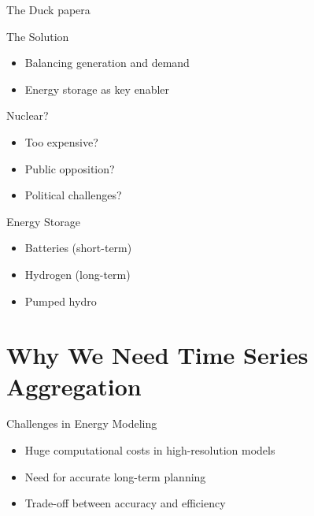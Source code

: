 \begin{frame}{The Duck}
  papera
\end{frame}

\begin{frame}{The Solution}
    \begin{itemize}
        \item Balancing generation and demand
        \item Energy storage as key enabler
    \end{itemize}
\end{frame}

\begin{frame}{Nuclear?}
    \begin{itemize}
        \item Too expensive?
        \item Public opposition?
        \item Political challenges?
    \end{itemize}
\end{frame}

\begin{frame}{Energy Storage}
    \begin{itemize}
        \item Batteries (short-term)
        \item Hydrogen (long-term)
        \item Pumped hydro
    \end{itemize}
\end{frame}

\section{Why We Need Time Series Aggregation}

\begin{frame}{Challenges in Energy Modeling}
    \begin{itemize}
        \item Huge computational costs in high-resolution models
        \item Need for accurate long-term planning
        \item Trade-off between accuracy and efficiency
    \end{itemize}
\end{frame}

